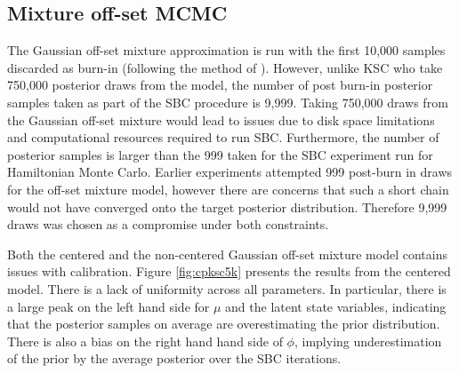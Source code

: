 \documentclass[12pt, a4paper]{article}
\begin{document}
    
    \subsection{Mixture off-set MCMC}
    The Gaussian off-set mixture approximation is run with the first 10,000 samples discarded as burn-in (following the method of \citet{kim1998stochastic}). However, unlike KSC who take 750,000 posterior draws from the model, the number of post burn-in posterior samples taken as part of the SBC procedure is 9,999. Taking 750,000 draws from the Gaussian off-set mixture would lead to issues due to disk space limitations and computational resources required to run SBC. Furthermore, the number of posterior samples is larger than the 999 taken for the SBC experiment run for Hamiltonian Monte Carlo. Earlier experiments attempted 999 post-burn in draws for the off-set mixture model, however there are concerns that such a short chain would not have converged onto the target posterior distribution. Therefore 9,999 draws was chosen as a compromise under both constraints. 

    Both the centered and the non-centered Gaussian off-set mixture model contains issues with calibration. Figure \ref{fig:cpksc5k} presents the results from the centered model. There is a lack of uniformity across all parameters. In particular, there is a large peak on the left hand side for $\mu$ and the latent state variables, indicating that the posterior samples on average are overestimating the prior distribution. There is also a bias on the right hand hand side of $\phi$, implying underestimation of the prior by the average posterior over the SBC iterations. 
\end{document}
